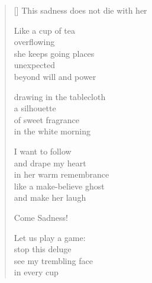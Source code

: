 \documentclass[11pt,a4paper]{article}
\begin{document}
\thispagestyle{empty}

\poemtitle{}

\settowidth{\versewidth}{This sadness does not die with you}

\bigskip

\begin{verse}[\versewidth]
This sadness does not die with her

Like a cup of tea\\
overflowing\\
she keeps going places\\
unexpected\\
beyond will and power

drawing in the tablecloth\\
a silhouette\\
of sweet fragrance\\
in the white morning

I want to follow\\
and drape my heart\\
in her warm remembrance\\
like a make-believe ghost\\
and make her laugh

Come Sadness!

Let us play a game:\\
stop this deluge\\
see my trembling face\\
in every cup
\end{verse}
\end{document}
